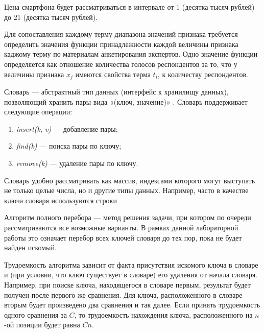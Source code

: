 Цена смартфона будет рассматриваться в интервале от 1 (десятка тысяч рублей) до 21 (десятка тысяч рублей).

Для сопоставления каждому терму диапазона значений признака требуется определить значения функции принадлежности каждой величины признака каджому терму по материалам анкетирования экспертов. Одно значение функции определяется как отношение количества голосов респондентов за то, что у величины признака $x_j$ имеются свойства терма $t_i$, к количеству респондентов.


Словарь \cite{dict} --- абстрактный тип данных (интерфейс к хранилищу данных), позволяющий хранить пары вида «(ключ, значение)» . Словарь поддерживает следующие операции: 
\begin{enumerate}
	\item \textit{insert(k, v)} --- добавление пары;
	\item \textit{find(k)} --- поиска пары по ключу;
	\item \textit{remove(k)} --- удаление пары по ключу.
\end{enumerate}

Словарь удобно рассматривать как массив, индексами которого могут выступать не только целые числа, но и другие типы данных. Например, часто в качестве ключа словаря используются строки 

Алгоритм полного перебора \cite{AI} --- метод решения задачи, при котором по очереди рассматриваются все возможные варианты. 
В рамках данной лабораторной работы это означает перебор всех ключей словаря до тех пор, пока не будет найден искомый.

Трудоемкость алгоритма зависит от факта присутствия искомого ключа в словаре и (при условии, что ключ существует в словаре) его удаления от начала словаря. Например, при поиске ключа, находящегося в словаре первым, результат будет получен после первого же сравнения. Для ключа, расположенного в словаре вторым будет произведено два сравнения и так далее. Если принять трудоемкость одного сравнения за $C$, то трудоемкость нахождения ключа, расположенного на $n$-ой позиции будет равна $Cn$.


